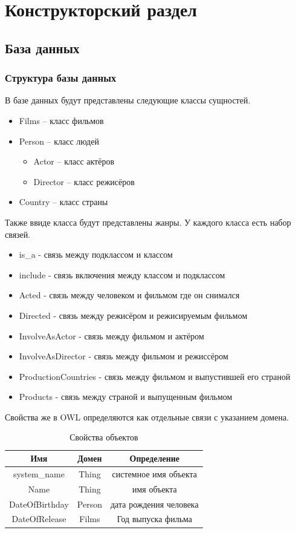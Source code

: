 \chapter{Конструкторский раздел}
\label{cha:design}
\section{База данных}
\subsection{Структура базы данных}
В базе данных будут представлены следующие классы сущностей.
\begin{itemize}
\item Films -- класс фильмов
\item Person -- класс людей
\begin{itemize}
\item Actor -- класс актёров
\item Director -- класс режисёров
\end{itemize}
\item Country -- класс страны
\end{itemize}
Также ввиде класса будут представлены жанры. 
У каждого класса есть набор связей.
\begin{itemize}
\item is\_a - связь между подклассом и классом
\item include - связь включения между классом и подклассом 
\item Acted - связь между человеком и фильмом где он снимался
\item Directed - связь между режисёром и режисируемым фильмом 
\item InvolveAsActor - связь между фильмом и актёром
\item InvolveAsDirector - связь между фильмом и режиссёром
\item ProductionCountries - связь между фильмом и выпустившей его страной 
\item Products - связь между страной и выпущенным фильмом
\end{itemize}
Свойства же в OWL определяются как отдельные связи с указанием домена.
\begin{table}[ht]
  \caption{Свойства объектов}
  \begin{tabular}{|c|c|c|}
  \hline
    Имя    & Домен & Определение\\
  \hline
  system\_name & Thing & системное имя объекта\\
  \hline
  Name & Thing & имя объекта\\
  \hline
  DateOfBirthday  & Person   & дата рождения человека\\  
  \hline
  DateOfRelease & Films & Год выпуска фильма \\
  \hline
  \end{tabular}
  \label{tab:tabular}
\end{table}
